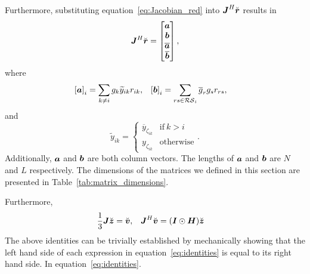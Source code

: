 \documentclass[useAMS,usenatbib]{mn2e}
\newcommand{\bz}{\bmath{z}}
\newcommand{\br}{\bmath{r}}
\newcommand{\bv}{\bmath{v}}
\newcommand{\bJ}{\bmath{J}}
\newcommand{\bH}{\bmath{H}}
\newcommand{\bI}{\bmath{I}}
\newcommand{\ba}{\bmath{a}}
\newcommand{\bb}{\bmath{b}}
\newcommand{\conj}[1]{\overline{#1}}
\begin{document}
Furthermore, substituting equation~\ref{eq:Jacobian_red} into $\bJ^H\breve{\br}$ results in
\begin{equation}
\bJ^H\breve{\br} = \begin{bmatrix}
                   \ba \\
                   \bb \\
                   \conj{\ba}\\
                   \conj{\bb}
                   \end{bmatrix},
\end{equation}
where
\begin{align}
\label{eq:ab}
\left [ \ba \right ]_i &= \sum_{k\neq i} g_k \widetilde{y}_{ik}r_{ik},  & \left [ \bb \right ]_i &= \sum_{rs\in\mathcal{RS}_i}\conj{g}_r g_s r_{rs},
\end{align}
and
\begin{equation}
\label{eq:y_tilde}
\widetilde{y}_{ik} = 
\begin{cases}
\conj{y}_{\zeta_{ik}} & \textrm{if}~k > i\\
y_{\zeta_{ik}} & \textrm{otherwise}
\end{cases}.
\end{equation}
Additionally, $\ba$ and $\bb$ are both column vectors. The lengths of $\ba$ and $\bb$ are $N$ and $L$ respectively.
The dimensions of the matrices we defined in this section are presented in Table~\ref{tab:matrix_dimensions}.

Furthermore,
\begin{align}
\label{eq:identities}
\frac{1}{3}\bJ\breve{\bz} &= \breve{\bv}, & \bJ^H\breve{\bv} &= (\bI\odot\bH)\breve{\bz} 
\end{align}
The above identities can be trivially established by mechanically showing that the left hand side of each expression in equation~\ref{eq:identities} is equal to its right hand side.
In equation~\ref{eq:identities}.
\end{document}
